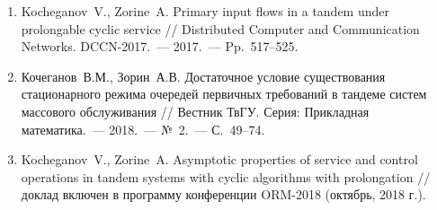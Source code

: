 \documentclass[14pt]{extarticle}
\theoremstyle{theorem}
\theoremstyle{remark}
\begin{document}
\begin{enumerate}
\item
Kocheganov~V., Zorine~A. Primary input flows in a tandem under prolongable cyclic service // Distributed Computer and Communication Networks. DCCN-2017.~--- 2017.~--- Pp.~517--525.

\item Кочеганов~В.М., Зорин~А.В. Достаточное условие существования стационарного режима очередей первичных требований в тандеме систем массового обслуживания // Вестник ТвГУ. Серия: Прикладная математика.~--- 2018.~--- №~2.~--- С.~49--74.
\item 
Kocheganov~V., Zorine~A.  Asymptotic properties of service and control operations in tandem systems with cyclic algorithms with prolongation // доклад включен в программу конференции ORM-2018 (октябрь, 2018 г.).
\end{enumerate}
\end{document}
